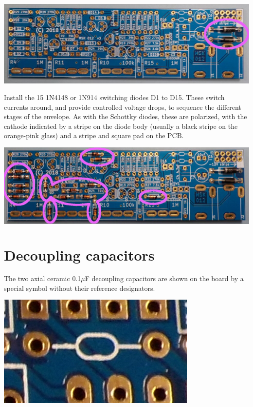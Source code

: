 \noindent\includegraphics[width=\linewidth]{schottky.jpg}

Install the 15 1N4148 or 1N914 switching diodes D1 to D15.  These switch
currents around, and provide controlled voltage drops, to sequence the
different stages of the envelope.  As with the Schottky diodes, these are
polarized, with the cathode indicated by a stripe on the diode body (usually
a black stripe on the orange-pink glass) and a stripe and square pad on the
PCB.

\nopagebreak
\noindent\includegraphics[width=\linewidth]{1n4148.jpg}

\pagebreak

\section{Decoupling capacitors}

The two axial ceramic 0.1$\mu$F decoupling capacitors are shown on the board
by a special symbol without their reference designators.

\noindent\includegraphics[width=\linewidth]{decoup-symbol.jpg}%
\label{pag:decoup-symbol}

